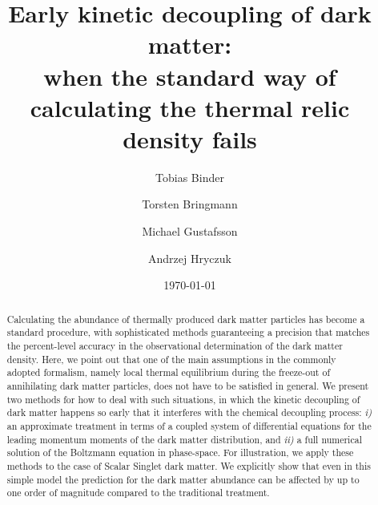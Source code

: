 \documentclass[twocolumn,showpacs,amsmath,amssymb,superscriptaddress,nofootinbib]{revtex4-1}
\begin{document}
\title{Early kinetic decoupling of dark matter:\\ 
when the standard way of calculating the  thermal relic density fails}

\author{Tobias Binder}
\author{Torsten Bringmann}

\author{Michael Gustafsson}
\author{Andrzej Hryczuk}


\date{\today}

\begin{abstract} 

Calculating the abundance of thermally produced dark matter particles has become a standard procedure, with 
sophisticated methods guaranteeing a precision that matches the percent-level accuracy in the observational 
determination of the dark matter density. 
Here, we point out that one of the main assumptions in the commonly
adopted formalism, namely local thermal equilibrium during the freeze-out of annihilating dark matter
particles, does not have to be satisfied in general. We present two methods for how to deal with such 
situations, in which the kinetic decoupling of dark matter happens so early that it interferes with the
chemical decoupling process: {\it i)} an approximate treatment in terms of a coupled system of differential 
equations for the leading momentum moments of the dark matter distribution, and {\it ii)} a full numerical solution of
the Boltzmann equation in phase-space. For illustration, we apply these methods to the case of 
Scalar Singlet dark matter. We explicitly show that even in this simple model
the prediction for the dark matter abundance can be affected by up to one order of magnitude
compared to the traditional treatment.

\end{abstract}
\end{document}
